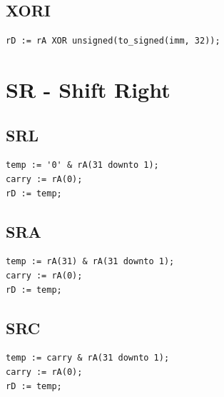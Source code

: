 \documentclass{UoYCSproject}
\begin{document}
\subsection{XORI}

\begin{lstlisting}
rD := rA XOR unsigned(to_signed(imm, 32));
\end{lstlisting}

\section{SR - Shift Right}

\subsection{SRL}

\begin{lstlisting}
temp := '0' & rA(31 downto 1);
carry := rA(0);
rD := temp;
\end{lstlisting}

\subsection{SRA}

\begin{lstlisting}
temp := rA(31) & rA(31 downto 1);
carry := rA(0);
rD := temp;
\end{lstlisting}

\subsection{SRC}

\begin{lstlisting}
temp := carry & rA(31 downto 1);
carry := rA(0);
rD := temp;
\end{lstlisting}

\printbibliography
\end{document}

